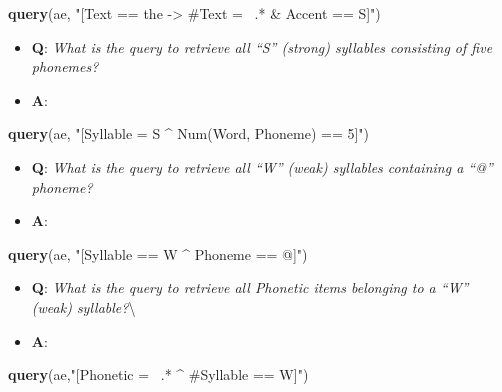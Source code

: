 \documentclass[]{book}
\newenvironment{Shaded}{\begin{snugshade}}{\end{snugshade}}
\newcommand{\KeywordTok}[1]{\textcolor[rgb]{0.13,0.29,0.53}{\textbf{#1}}}
\newcommand{\NormalTok}[1]{#1}
\newcommand{\StringTok}[1]{\textcolor[rgb]{0.31,0.60,0.02}{#1}}
\providecommand{\tightlist}{%
  \setlength{\itemsep}{0pt}\setlength{\parskip}{0pt}}
\begin{document}
\begin{Shaded}
\begin{Highlighting}[]
\KeywordTok{query}\NormalTok{(ae, }\StringTok{"[Text == the -> #Text =~ .* & Accent == S]"}\NormalTok{)}
\end{Highlighting}
\end{Shaded}

\begin{itemize}
\tightlist
\item
  \textbf{Q}: \emph{What is the query to retrieve all ``S'' (strong) syllables consisting of five phonemes?}
\item
  \textbf{A}:
\end{itemize}

\begin{Shaded}
\begin{Highlighting}[]
\KeywordTok{query}\NormalTok{(ae, }\StringTok{"[Syllable = S ^ Num(Word, Phoneme) == 5]"}\NormalTok{)}
\end{Highlighting}
\end{Shaded}

\begin{itemize}
\tightlist
\item
  \textbf{Q}: \emph{What is the query to retrieve all ``W'' (weak) syllables containing a ``@'' phoneme?}
\item
  \textbf{A}:
\end{itemize}

\begin{Shaded}
\begin{Highlighting}[]
\KeywordTok{query}\NormalTok{(ae, }\StringTok{"[Syllable == W ^ Phoneme == @]"}\NormalTok{)}
\end{Highlighting}
\end{Shaded}

\begin{itemize}
\tightlist
\item
  \textbf{Q}: \emph{What is the query to retrieve all Phonetic items belonging to a ``W'' (weak) syllable?}\textbackslash{}
\item
  \textbf{A}:
\end{itemize}

\begin{Shaded}
\begin{Highlighting}[]
\KeywordTok{query}\NormalTok{(ae,}\StringTok{"[Phonetic =~ .* ^ #Syllable == W]"}\NormalTok{)}
\end{Highlighting}
\end{Shaded}
\end{document}
